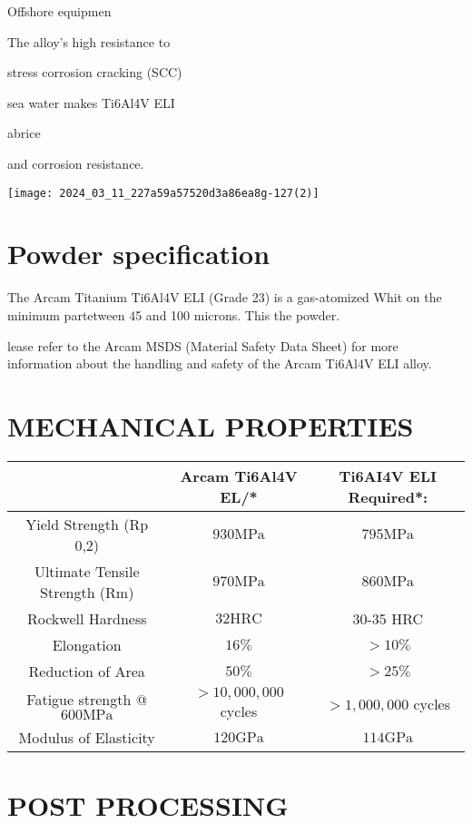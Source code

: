 \documentclass[10pt]{article}
\begin{document}
Offshore equipmen

The alloy's high resistance to

stress corrosion cracking (SCC)

sea water makes Ti6Al4V ELI

abrice

and corrosion resistance.

\begin{center}
\texttt{[image: 2024\_03\_11\_227a59a57520d3a86ea8g-127(2)]}
\end{center}

\section*{Powder specification}
The Arcam Titanium Ti6Al4V ELI (Grade 23) is a gas-atomized Whit on the minimum partetween 45 and 100 microns. This the powder.

lease refer to the Arcam MSDS (Material Safety Data Sheet) for more information about the handling and safety of the Arcam Ti6Al4V ELI alloy.

\section*{MECHANICAL PROPERTIES}
\begin{center}
\begin{tabular}{|c|c|c|}
\hline
 & Arcam Ti6Al4V EL/* & Ti6AI4V ELI Required*: \\
\hline
Yield Strength (Rp 0,2) & $930 \mathrm{MPa}$ & $795 \mathrm{MPa}$ \\
\hline
Ultimate Tensile Strength (Rm) & $970 \mathrm{MPa}$ & $860 \mathrm{MPa}$ \\
\hline
Rockwell Hardness & $32 \mathrm{HRC}$ & 30-35 HRC \\
\hline
Elongation & $16 \%$ & $>10 \%$ \\
\hline
Reduction of Area & $50 \%$ & $>25 \%$ \\
\hline
Fatigue strength @ $600 \mathrm{MPa}$ & $>10,000,000$ cycles & $>1,000,000$ cycles \\
\hline
Modulus of Elasticity & $120 \mathrm{GPa}$ & $114 \mathrm{GPa}$ \\
\hline
\end{tabular}
\end{center}

\section*{POST PROCESSING}
\end{document}
